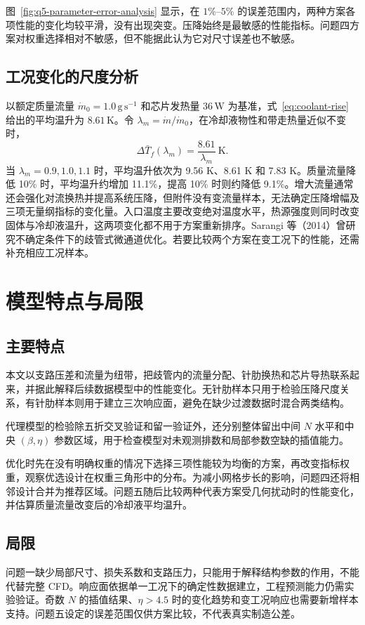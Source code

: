 \documentclass[withoutpreface,bwprint]{cumcmthesis}
\begin{document}
图~\ref{fig:q5-parameter-error-analysis} 显示，在 $1\%$--$5\%$ 的误差范围内，两种方案各项性能的变化均较平滑，没有出现突变。压降始终是最敏感的性能指标。问题四方案对权重选择相对不敏感，但不能据此认为它对尺寸误差也不敏感。

\subsection{工况变化的尺度分析}
以额定质量流量 $\dot m_0=1.0\,\mathrm{g\,s^{-1}}$ 和芯片发热量 $36\,\mathrm W$ 为基准，式~\eqref{eq:coolant-rise} 给出的平均温升为 $8.61\,\mathrm K$。令 $\lambda_m=\dot m/\dot m_0$，在冷却液物性和带走热量近似不变时，
\begin{equation}
\Delta\bar T_f(\lambda_m)=\frac{8.61}{\lambda_m}\ \mathrm K.
\end{equation}
当 $\lambda_m=0.9,1.0,1.1$ 时，平均温升依次为 9.56 K、8.61 K 和 7.83 K。质量流量降低 10\% 时，平均温升约增加 11.1\%，提高 10\% 时则约降低 9.1\%。增大流量通常还会强化对流换热并提高系统压降，但附件没有变流量样本，无法确定压降增幅及三项无量纲指标的变化量。入口温度主要改变绝对温度水平，热源强度则同时改变固体与冷却液温升，这两项变化都不用于方案重新排序。Sarangi 等（2014）曾研究不确定条件下的歧管式微通道优化\cite{Sarangi2014}。若要比较两个方案在变工况下的性能，还需补充相应工况样本。

\section{模型特点与局限}
\subsection{主要特点}
本文以支路压差和流量为纽带，把歧管内的流量分配、针肋换热和芯片导热联系起来，并据此解释后续数据模型中的性能变化。无针肋样本只用于检验压降尺度关系，有针肋样本则用于建立三次响应面，避免在缺少过渡数据时混合两类结构。

代理模型的检验除五折交叉验证和留一验证外，还分别整体留出中间 $N$ 水平和中央 $(\beta,\eta)$ 参数区域，用于检查模型对未观测排数和局部参数空缺的插值能力。

优化时先在没有明确权重的情况下选择三项性能较为均衡的方案，再改变指标权重，观察优选设计在权重三角形中的分布。为减小网格步长的影响，问题四还将相邻设计合并为推荐区域。问题五随后比较两种代表方案受几何扰动时的性能变化，并估算质量流量改变后的冷却液平均温升。
\subsection{局限}
问题一缺少局部尺寸、损失系数和支路压力，只能用于解释结构参数的作用，不能代替完整 CFD。响应面依据单一工况下的确定性数据建立，工程预测能力仍需实验验证。奇数 $N$ 的插值结果、$\eta>4.5$ 时的变化趋势和变工况响应也需要新增样本支持。问题五设定的误差范围仅供方案比较，不代表真实制造公差。
\end{document}
